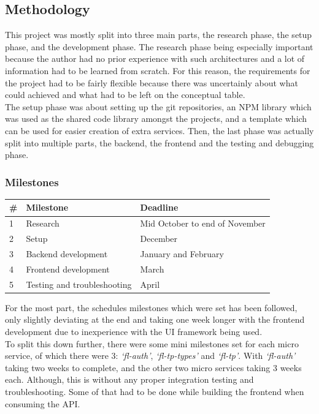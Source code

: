 \documentclass{article}
\newcommand{\vspaceconst}{-2ex}
\begin{document}
\begin{multicols}{2}
\subsection{Methodology}
\vspace{\vspaceconst}

This project was mostly split into three main parts, the research phase, the setup phase, and the development phase. The research phase being especially important because the author had no prior experience with such architectures and a lot of information had to be learned from scratch. For this reason, the requirements for the project had to be fairly flexible because there was uncertainly about what could achieved and what had to be left on the conceptual table.\\
The setup phase was about setting up the git repositories, an NPM library which was used as the shared code library amongst the projects, and a template which can be used for easier creation of extra services. Then, the last phase was actually split into multiple parts, the backend, the frontend and the testing and debugging phase.\\

\subsubsection{Milestones}
\vspace{\vspaceconst}
\begingroup
\centering
\begin{tabular}{l p{3.4cm} p{3.1cm}}
  \# & Milestone & Deadline\\
  \midrule
  1 & Research & Mid October to end of November\\
  2 & Setup & December\\
  3 & Backend development & January and February\\
  4 & Frontend development & March\\
  5 & Testing and troubleshooting & April\\
\end{tabular}
\endgroup

For the most part, the schedules milestones which were set has been followed, only slightly deviating at the end and taking one week longer with the frontend development due to inexperience with the UI framework being used.\\
To split this down further, there were some mini milestones set for each micro service, of which there were 3: \textit{`fl-auth'}, \textit{`fl-tp-types'} and \textit{`fl-tp'}. With \textit{`fl-auth'} taking two weeks to complete, and the other two micro services taking 3 weeks each. Although, this is without any proper integration testing and troubleshooting. Some of that had to be done while building the frontend when consuming the API.\\


\end{multicols}
\end{document}
